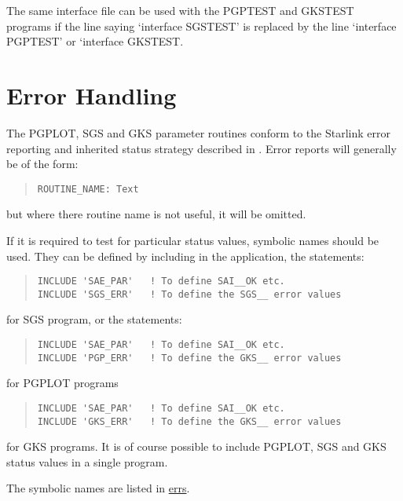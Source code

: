 The same interface file can be used with the PGPTEST and GKSTEST programs if
the line saying `interface SGSTEST' is replaced by the line `interface
PGPTEST' or `interface GKSTEST.

\section{Error Handling}
\label{errhnd}
The PGPLOT, SGS and GKS parameter routines conform to the Starlink error 
reporting and inherited status strategy described in .
Error reports will generally be of the form:
\begin{quote}
\begin{verbatim}
ROUTINE_NAME: Text
\end{verbatim}
\end{quote}
but where there routine name is not useful, it will be omitted.

If it is required to test for particular status values, symbolic names should
be used. They can be defined by including in the application, the statements:

\begin{quote}
\begin{verbatim}
INCLUDE 'SAE_PAR'   ! To define SAI__OK etc.
INCLUDE 'SGS_ERR'   ! To define the SGS__ error values
\end{verbatim}
\end{quote}

for SGS program, or the statements:

\begin{quote}
\begin{verbatim}
INCLUDE 'SAE_PAR'   ! To define SAI__OK etc.
INCLUDE 'PGP_ERR'   ! To define the GKS__ error values
\end{verbatim}
\end{quote}

for PGPLOT programs\begin{quote}

\begin{verbatim}
INCLUDE 'SAE_PAR'   ! To define SAI__OK etc.
INCLUDE 'GKS_ERR'   ! To define the GKS__ error values
\end{verbatim}
\end{quote}

for GKS programs. It is of course possible to include PGPLOT, SGS and GKS
status values in a single program.

The symbolic names are listed in \hyperref{here}{Section~}{}{errs}.

